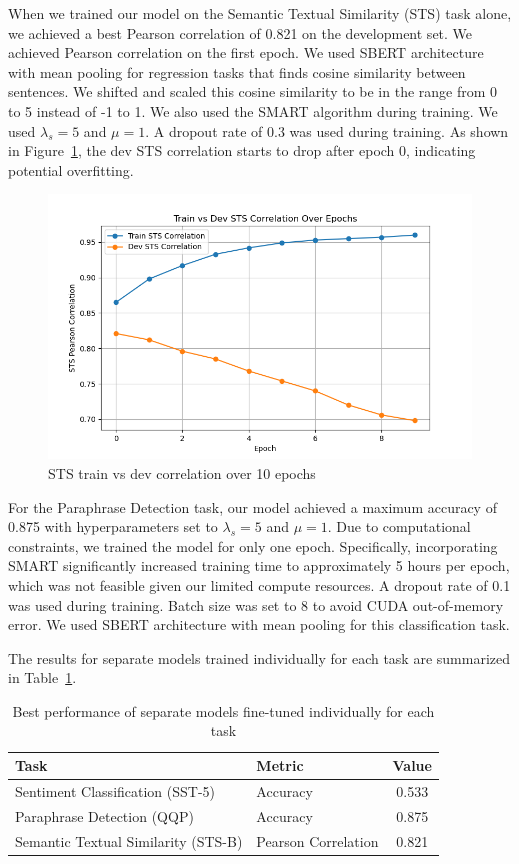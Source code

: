 When we trained our model on the Semantic Textual Similarity (STS) task alone, we achieved a best Pearson correlation of 0.821 on the development set. We achieved Pearson correlation on the first epoch. We used SBERT architecture with mean pooling for regression tasks that finds cosine similarity between sentences. We shifted and scaled this cosine similarity to be in the range from 0 to 5 instead of -1 to 1. We also used the SMART algorithm during training. We used $\lambda_s=5$ and $\mu=1$. A dropout rate of 0.3 was used during training. As shown in Figure~\ref{fig:sts_corr}, the dev STS correlation starts to drop after epoch 0, indicating potential overfitting.

\begin{figure}[H]
    \centering
    \includegraphics[width=0.8\linewidth]{Figures/sts_corr_plot.png}
    \caption{STS train vs dev correlation over 10 epochs}
    \label{fig:sts_corr}
\end{figure}

For the Paraphrase Detection task, our model achieved a maximum accuracy of 0.875 with hyperparameters set to $\lambda_s = 5$ and $\mu = 1$. Due to computational constraints, we trained the model for only one epoch. Specifically, incorporating SMART significantly increased training time to approximately 5 hours per epoch, which was not feasible given our limited compute resources. A dropout rate of 0.1 was used during training. Batch size was set to 8 to avoid CUDA out-of-memory error.  We used SBERT architecture with mean pooling for this classification task.

The results for separate models trained individually for each task are summarized in Table~\ref{tab:smart_per_task}.

\begin{table}[H]
    \centering
    \begin{tabular}{|l|l|c|}
    \hline
    \textbf{Task} & \textbf{Metric} & \textbf{Value} \\ 
    \hline
    Sentiment Classification (SST-5) & Accuracy & 0.533 \\ 
    \hline
    Paraphrase Detection (QQP) & Accuracy & 0.875 \\ 
    \hline
    Semantic Textual Similarity (STS-B) & Pearson Correlation & 0.821 \\ 
    \hline
    \end{tabular}
    \caption{Best performance of separate models fine-tuned individually for each task}
    \label{tab:smart_per_task}
\end{table}



